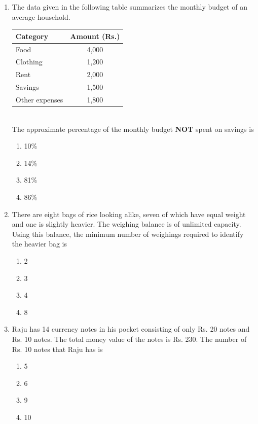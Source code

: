 \documentclass[journal,12pt,onecolumn]{IEEEtran}
\begin{document}
\begin{enumerate}[label=\arabic*.]
\item The data given in the following table summarizes the monthly budget of an average household.\\[2pt]
\begin{tabular}{|l|c|}
\hline
\textbf{Category} & \textbf{Amount (Rs.)} \\
\hline
Food & 4,000 \\
Clothing & 1,200 \\
Rent & 2,000 \\
Savings & 1,500 \\
Other expenses & 1,800 \\
\hline
\end{tabular}\\[2pt]
The approximate percentage of the monthly budget \textbf{NOT} spent on savings is
\begin{multicols}{2}
\begin{enumerate}[label=(\Alph*)]
\item 10\%
\item 14\%
\item 81\%
\item 86\%
\end{enumerate}
\end{multicols}

\item There are eight bags of rice looking alike, seven of which have equal weight and one is slightly heavier. The weighing balance is of unlimited capacity. Using this balance, the minimum number of weighings required to identify the heavier bag is
\begin{multicols}{2}
\begin{enumerate}[label=(\Alph*)]
\item 2
\item 3
\item 4
\item 8
\end{enumerate}
\end{multicols}

\item Raju has 14 currency notes in his pocket consisting of only Rs. 20 notes and Rs. 10 notes. The total money value of the notes is Rs. 230. The number of Rs. 10 notes that Raju has is
\begin{multicols}{2}
\begin{enumerate}[label=(\Alph*)]
\item 5
\item 6
\item 9
\item 10
\end{enumerate}
\end{multicols}
\end{enumerate}
\end{document}
